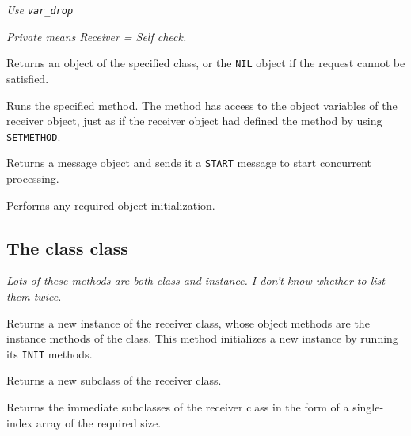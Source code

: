 \emph{Use \texttt{var\_drop}}

\emph{Private means Receiver = Self check.}



Returns an object of the specified class, or the \texttt{NIL} object if
the request cannot be satisfied.



Runs the specified method. The method has access to the object variables
of the receiver object, just as if the receiver object had defined the
method by using \texttt{SETMETHOD}.



Returns a message object and sends it a \texttt{START} message to start
concurrent processing.



Performs any required object initialization.

\subsection{The class class}\label{the-class-class}



\emph{Lots of these methods are both class and instance. I don't know
whether to list them twice.}



Returns a new instance of the receiver class, whose object methods are
the instance methods of the class. This method initializes a new
instance by running its \texttt{INIT} methods.



Returns a new subclass of the receiver class.



Returns the immediate subclasses of the receiver class in the form of a
single-index array of the required size.


